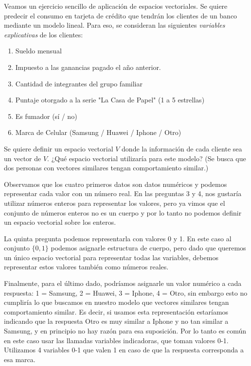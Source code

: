 \begin{aplicacion}
Veamos un ejercicio sencillo de aplicación de espacios vectoriales.
Se quiere predecir el consumo en tarjeta de crédito que tendrán los clientes de un banco mediante un modelo lineal.
Para eso, se consideran las siguientes \emph{variables explicativas} de los clientes:

\begin{enumerate}
\item Sueldo mensual
\item Impuesto a las ganancias pagado el año anterior.
\item Cantidad de integrantes del grupo familiar
\item Puntaje otorgado a la serie "La Casa de Papel" (1 a 5 estrellas)
\item Es fumador (sí / no)
\item Marca de Celular (Samsung / Huawei / Iphone / Otro)
\end{enumerate}

Se quiere definir un espacio vectorial $V$ donde la información de cada cliente sea un vector de $V$. ¿Qué espacio vectorial utilizaría para este modelo? (Se busca que dos personas con vectores similares tengan comportamiento similar.)

Observamos que los cuatro primeros datos son datos num\'ericos y podemos representar cada valor con un número real. En las preguntas 3 y 4, nos gustaría utilizar números enteros para representar los valores, pero ya vimos que el conjunto de números enteros no es un cuerpo y por lo tanto no podemos definir un espacio vectorial sobre los enteros.

La quinta pregunta podemos representarla con valores 0 y 1. En este caso al conjunto $\{0, 1\}$ podemos asignarle estructura de cuerpo, pero dado que queremos un único espacio vectorial para representar todas las variables, debemos representar estos valores también como números reales.

Finalmente, para el último dado, podríamos asignarle un valor numérico a cada respuesta: 1 = Samsung, 2 = Huawei, 3 = Iphone, 4 = Otro, sin embargo esto no cumpliría lo que buscamos en nuestro modelo que vectores similares tengan comportamiento similar. Es decir, si usamos esta representación estaríamos indicando que la respuesta Otro es muy similar a Iphone y no tan similar a Samsung, y en principio no hay razón para esa suposición. Por lo tanto es común en este caso usar las llamadas variables indicadoras, que toman valores 0-1. Utilizamos 4 variables 0-1 que valen 1 en caso de que la respuesta corresponda a esa marca.


\end{aplicacion}
